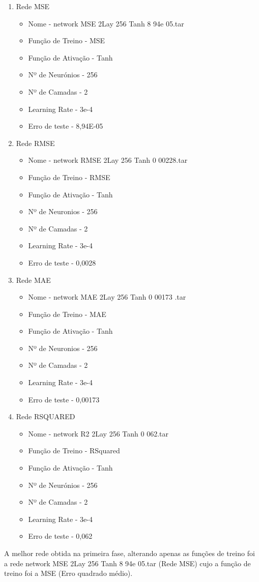 \documentclass[10pt]{article}
\begin{document}
\begin{enumerate}
\item Rede MSE
  \begin{itemize}
    \item Nome - network MSE 2Lay 256 Tanh 8 94e 05.tar
    \item Função de Treino - MSE
    \item Função de Ativação - Tanh
    \item Nº de Neurónios - 256
    \item Nº de Camadas - 2
    \item Learning Rate - 3e-4
    \item Erro de teste - 8,94E-05
  \end{itemize}
  \vspace{2cm}
  \item Rede RMSE
  \begin{itemize}
    \item Nome - network RMSE 2Lay 256 Tanh 0 00228.tar
    \item Função de Treino - RMSE
    \item Função de Ativação - Tanh
    \item Nº de Neuronios - 256
    \item Nº de Camadas - 2
    \item Learning Rate - 3e-4
    \item Erro de teste - 0,0028
  \end{itemize}  
  \vspace{2cm}
  \item Rede MAE
  \begin{itemize} 
    \item Nome - network MAE 2Lay 256 Tanh 0 00173 .tar
    \item Função de Treino - MAE
    \item Função de Ativação - Tanh
    \item Nº de Neuronios - 256
    \item Nº de Camadas - 2
    \item Learning Rate - 3e-4
    \item Erro de teste - 0,00173
  \end{itemize}
  \vspace{2cm}
  \item Rede RSQUARED
  \begin{itemize}
    \item Nome - network R2 2Lay 256 Tanh 0 062.tar
    \item Função de Treino - RSquared
    \item Função de Ativação - Tanh
    \item Nº de Neurónios - 256
    \item Nº de Camadas - 2
    \item Learning Rate - 3e-4
    \item Erro de teste - 0,062   
  \end{itemize}
\end{enumerate}
\vspace{1cm}
A melhor rede obtida na primeira fase, alterando apenas as funções de
treino foi a rede network MSE 2Lay 256 Tanh 8 94e 05.tar (Rede MSE) cujo a 
função de treino foi a MSE (Erro  quadrado  médio).
\end{document}
